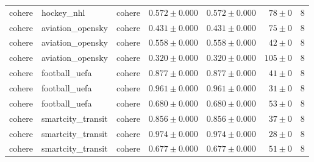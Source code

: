 \begin{table}[htbp]
\begin{tabular}{l l l r r r r}
cohere & hockey\_nhl & cohere & $0.572\pm0.000$ & $0.572\pm0.000$ & $78\pm0$ & 8 \\
cohere & aviation\_opensky & cohere & $0.431\pm0.000$ & $0.431\pm0.000$ & $75\pm0$ & 8 \\
cohere & aviation\_opensky & cohere & $0.558\pm0.000$ & $0.558\pm0.000$ & $42\pm0$ & 8 \\
cohere & aviation\_opensky & cohere & $0.320\pm0.000$ & $0.320\pm0.000$ & $105\pm0$ & 8 \\
cohere & football\_uefa & cohere & $0.877\pm0.000$ & $0.877\pm0.000$ & $41\pm0$ & 8 \\
cohere & football\_uefa & cohere & $0.961\pm0.000$ & $0.961\pm0.000$ & $31\pm0$ & 8 \\
cohere & football\_uefa & cohere & $0.680\pm0.000$ & $0.680\pm0.000$ & $53\pm0$ & 8 \\
cohere & smartcity\_transit & cohere & $0.856\pm0.000$ & $0.856\pm0.000$ & $37\pm0$ & 8 \\
cohere & smartcity\_transit & cohere & $0.974\pm0.000$ & $0.974\pm0.000$ & $28\pm0$ & 8 \\
cohere & smartcity\_transit & cohere & $0.677\pm0.000$ & $0.677\pm0.000$ & $51\pm0$ & 8 \\
\hline
\end{tabular}
\end{table}
